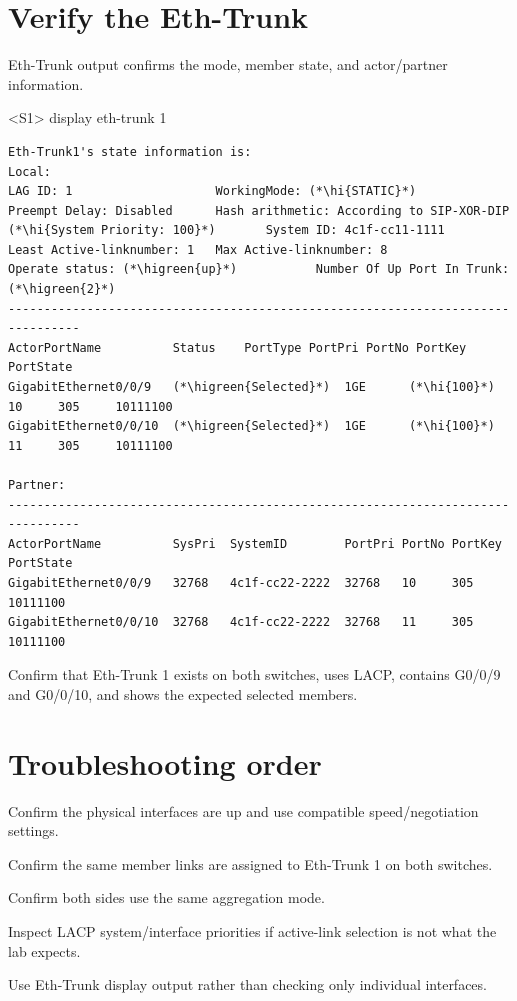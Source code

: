 \section{Verify the Eth-Trunk}
Eth-Trunk output confirms the mode, member state, and actor/partner information.

\begin{vrpbox}{<S1> display eth-trunk 1}
\begin{lstlisting}[style=dcnvrp]
Eth-Trunk1's state information is:
Local:
LAG ID: 1                    WorkingMode: (*\hi{STATIC}*)
Preempt Delay: Disabled      Hash arithmetic: According to SIP-XOR-DIP
(*\hi{System Priority: 100}*)       System ID: 4c1f-cc11-1111
Least Active-linknumber: 1   Max Active-linknumber: 8
Operate status: (*\higreen{up}*)           Number Of Up Port In Trunk: (*\higreen{2}*)
--------------------------------------------------------------------------------
ActorPortName          Status    PortType PortPri PortNo PortKey PortState
GigabitEthernet0/0/9   (*\higreen{Selected}*)  1GE      (*\hi{100}*)     10     305     10111100
GigabitEthernet0/0/10  (*\higreen{Selected}*)  1GE      (*\hi{100}*)     11     305     10111100

Partner:
--------------------------------------------------------------------------------
ActorPortName          SysPri  SystemID        PortPri PortNo PortKey PortState
GigabitEthernet0/0/9   32768   4c1f-cc22-2222  32768   10     305     10111100
GigabitEthernet0/0/10  32768   4c1f-cc22-2222  32768   11     305     10111100
\end{lstlisting}
\end{vrpbox}

\begin{verification}
Confirm that Eth-Trunk 1 exists on both switches, uses LACP, contains G0/0/9 and G0/0/10, and shows the expected selected members.
\end{verification}

\section{Troubleshooting order}
\begin{netsteps}
\item Confirm the physical interfaces are up and use compatible speed/negotiation settings.
\item Confirm the same member links are assigned to Eth-Trunk 1 on both switches.
\item Confirm both sides use the same aggregation mode.
\item Inspect LACP system/interface priorities if active-link selection is not what the lab expects.
\item Use Eth-Trunk display output rather than checking only individual interfaces.
\end{netsteps}

